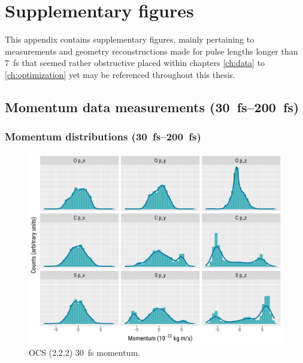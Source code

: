 \chapter{Supplementary figures}\label{appx:supplementaryFigures}

This appendix contains supplementary figures, mainly pertaining to measurements and geometry reconstructions made for pulse lengths longer than \SI{7}{\fs} that seemed rather obstructive placed within chapters \ref{ch:data} to \ref{ch:optimization} yet may be referenced throughout this thesis.

\section{Momentum data measurements (\SIrange{30}{200}{\femto\s})}

\subsection{Momentum distributions (\SIrange{30}{200}{\femto\s})}

\begin{figure}[H]
  \centering
  \includegraphics[width=\textwidth]{Plots/OCS22230fsMomentum}
  \caption[OCS (2,2,2) \SI{30}{\fs} momentum.]
  {OCS (2,2,2) \SI{30}{\fs} momentum.}
  \label{fig:OCS22230fsMomentum}
\end{figure}


